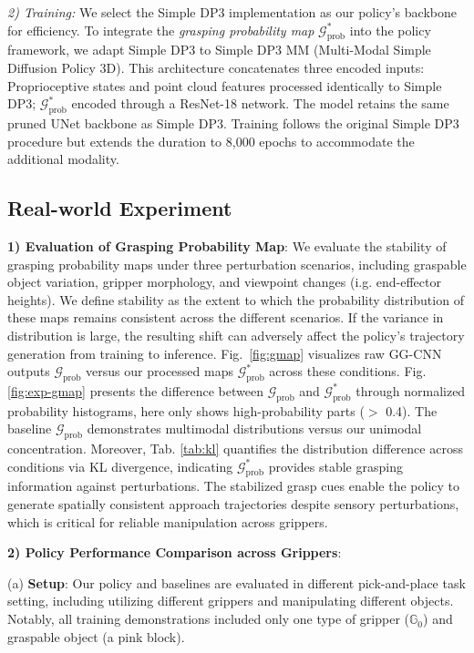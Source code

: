 \textit{2) Training:}  We select the Simple DP3 implementation \cite{Ze2024DP3} as our policy's backbone for efficiency. To integrate the \textit{grasping probability map} $\mathcal{G}^*_{\text{prob}}$ into the policy framework, we adapt Simple DP3 to Simple DP3 MM (Multi-Modal Simple Diffusion Policy 3D). This architecture concatenates three encoded inputs: Proprioceptive states and point cloud features processed identically to Simple DP3; $\mathcal{G}^*_{\text{prob}}$ encoded through a ResNet-18 network. The model retains the same pruned UNet backbone as Simple DP3. Training follows the original Simple DP3 procedure but extends the duration to 8,000 epochs to accommodate the additional modality.



\subsection{Real-world Experiment}
\textbf{1) Evaluation of Grasping Probability Map}: 
We evaluate the stability of grasping probability maps under three perturbation scenarios, including graspable object variation, gripper morphology, and viewpoint changes (i.g. end-effector heights). We define stability as the extent to which the probability distribution of these maps remains consistent across the different scenarios. If the variance in distribution is large, the resulting shift can adversely affect the policy’s trajectory generation from training to inference. Fig.~\ref{fig:gmap} visualizes raw GG-CNN outputs $\mathcal{G}_{\text{prob}}$ versus our processed maps $\mathcal{G}^*_{\text{prob}}$ across these conditions. Fig. \ref{fig:exp-gmap} presents the difference between $\mathcal{G}_{\text{prob}}$ and $\mathcal{G}^*_{\text{prob}}$ through normalized probability histograms, here only shows high-probability parts ($>$ 0.4). The baseline $\mathcal{G}_{\text{prob}}$ demonstrates multimodal distributions versus our unimodal concentration. Moreover, Tab. \ref{tab:kl} quantifies the distribution difference across conditions via KL divergence, indicating $\mathcal{G}^*_{\text{prob}}$ provides stable grasping information against perturbations. The stabilized grasp cues enable the policy to generate spatially consistent approach trajectories despite sensory perturbations, which is critical for reliable manipulation across grippers. 

\textbf{2) Policy Performance Comparison across Grippers}:

(a) \textbf{Setup}: Our policy and baselines are evaluated in different pick-and-place task setting, including utilizing different grippers and manipulating different objects. Notably, all training demonstrations included only one type of gripper ($\mathbb{G}_0$) and graspable object (a pink block).

